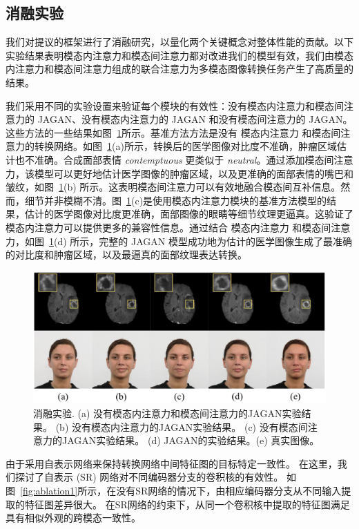 \subsection{消融实验}

我们对提议的框架进行了消融研究，以量化两个关键概念对整体性能的贡献。以下实验结果表明模态内注意力和模态间注意力都对改进我们的模型有效，我们由模态内注意力和模态间注意力组成的联合注意力为多模态图像转换任务产生了高质量的结果。

我们采用不同的实验设置来验证每个模块的有效性：没有模态内注意力和模态间注意力的 JAGAN、没有模态内注意力的 JAGAN 和没有模态间注意力的 JAGAN。这些方法的一些结果如图~\ref{fig:ablation}所示。基准方法方法是没有 模态内注意力 和模态间注意力的转换网络。如图~\ref{fig:ablation}(a)所示，转换后的医学图像对比度不准确，肿瘤区域估计也不准确。合成面部表情 \textit{contemptuous} 更类似于 \textit{neutral}。通过添加模态间注意力，该模型可以更好地估计医学图像的肿瘤区域，以及更准确的面部表情的嘴巴和皱纹，如图~\ref{fig:ablation}(b) 所示。这表明模态间注意力可以有效地融合模态间互补信息。然而，细节并非模糊不清。图~\ref{fig:ablation}(c)是使用模态内注意力模块的基准方法模型的结果，估计的医学图像对比度更准确，面部图像的眼睛等细节纹理更逼真。这验证了模态内注意力可以提供更多的兼容性信息。通过结合 模态内注意力 和模态间注意力，如图~\ref{fig:ablation}(d) 所示，完整的 JAGAN 模型成功地为估计的医学图像生成了最准确的对比度和肿瘤区域，以及最逼真的面部纹理表达转换。

\begin{figure}
	\begin{center}
		\includegraphics[width=0.8\columnwidth]{figures/JAGAN/ablation.pdf}
	\end{center}
	\caption{消融实验. (a) 没有模态内注意力和模态间注意力的JAGAN实验结果。 (b) 没有模态内注意力的JAGAN实验结果。 (c) 没有模态间注意力的JAGAN实验结果。 (d) JAGAN的实验结果。(e) 真实图像。}
	\label{fig:ablation}
\end{figure}

由于采用自表示网络来保持转换网络中间特征图的目标特定一致性。 在这里，我们探讨了自表示 (SR) 网络对不同编码器分支的卷积核的有效性。 如图~\ref{fig:ablation1}所示，在没有SR网络的情况下，由相应编码器分支从不同输入提取的特征图差异很大。 在SR网络的约束下，从同一个卷积核中提取的特征图满足具有相似外观的跨模态一致性。

